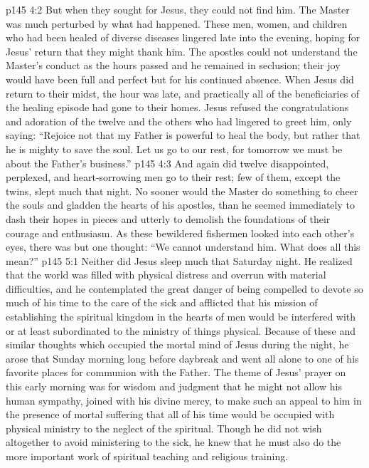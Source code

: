 \vs p145 4:2 But when they sought for Jesus, they could not find him. The Master was much perturbed by what had happened. These men, women, and children who had been healed of diverse diseases lingered late into the evening, hoping for Jesus’ return that they might thank him. The apostles could not understand the Master’s conduct as the hours passed and he remained in seclusion; their joy would have been full and perfect but for his continued absence. When Jesus did return to their midst, the hour was late, and practically all of the beneficiaries of the healing episode had gone to their homes. Jesus refused the congratulations and adoration of the twelve and the others who had lingered to greet him, only saying: \textcolor{ubdarkred}{“Rejoice not that my Father is powerful to heal the body, but rather that he is mighty to save the soul. Let us go to our rest, for tomorrow we must be about the Father’s business.”}
\vs p145 4:3 And again did twelve disappointed, perplexed, and heart\hyp{}sorrowing men go to their rest; few of them, except the twins, slept much that night. No sooner would the Master do something to cheer the souls and gladden the hearts of his apostles, than he seemed immediately to dash their hopes in pieces and utterly to demolish the foundations of their courage and enthusiasm. As these bewildered fishermen looked into each other’s eyes, there was but one thought: “We cannot understand him. What does all this mean?”
\vs p145 5:1 Neither did Jesus sleep much that Saturday night. He realized that the world was filled with physical distress and overrun with material difficulties, and he contemplated the great danger of being compelled to devote so much of his time to the care of the sick and afflicted that his mission of establishing the spiritual kingdom in the hearts of men would be interfered with or at least subordinated to the ministry of things physical. Because of these and similar thoughts which occupied the mortal mind of Jesus during the night, he arose that Sunday morning long before daybreak and went all alone to one of his favorite places for communion with the Father. The theme of Jesus’ prayer on this early morning was for wisdom and judgment that he might not allow his human sympathy, joined with his divine mercy, to make such an appeal to him in the presence of mortal suffering that all of his time would be occupied with physical ministry to the neglect of the spiritual. Though he did not wish altogether to avoid ministering to the sick, he knew that he must also do the more important work of spiritual teaching and religious training.
